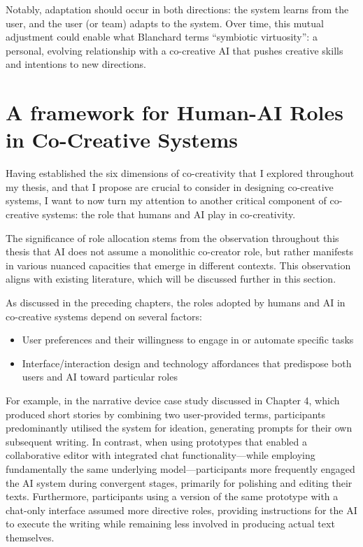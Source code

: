 Notably, adaptation should occur in both directions: the system learns from the user, and the user (or team) adapts to the system. Over time, this mutual adjustment could enable what Blanchard \cite{Blanchard2024-jz} terms “symbiotic virtuosity”: a personal, evolving relationship with a co-creative AI that pushes creative skills and intentions to new directions.

\section{A framework for Human-AI Roles in Co-Creative Systems}

Having established the six dimensions of co-creativity that I explored throughout my thesis, and that I propose are crucial to consider in designing co-creative systems, I want to now turn my attention to another critical component of co-creative systems: the role that humans and AI play in co-creativity.

The significance of role allocation stems from the observation throughout this thesis that AI does not assume a monolithic co-creator role, but rather manifests in various nuanced capacities that emerge in different contexts. This observation aligns with existing literature, which will be discussed further in this section.

As discussed in the preceding chapters, the roles adopted by humans and AI in co-creative systems depend on several factors:

\begin{itemize}
    \item User preferences and their willingness to engage in or automate specific tasks
    \item Interface/interaction design and technology affordances that predispose both users and AI toward particular roles
\end{itemize}

For example, in the narrative device case study discussed in Chapter 4, which produced short stories by combining two user-provided terms, participants predominantly utilised the system for ideation, generating prompts for their own subsequent writing. In contrast, when using prototypes that enabled a collaborative editor with integrated chat functionality—while employing fundamentally the same underlying model—participants more frequently engaged the AI system during convergent stages, primarily for polishing and editing their texts. Furthermore, participants using a version of the same prototype with a chat-only interface assumed more directive roles, providing instructions for the AI to execute the writing while remaining less involved in producing actual text themselves.


